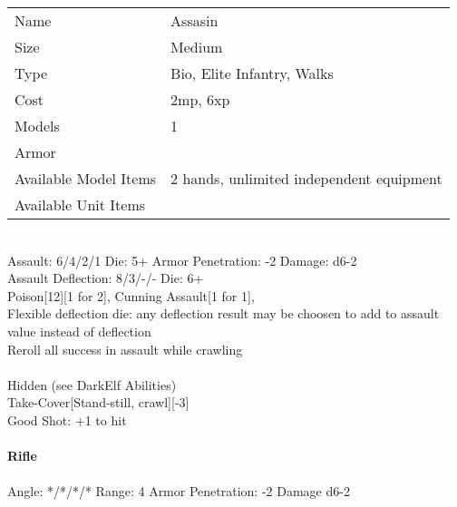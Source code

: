 \begin{tabular}{ll}
  Name & Assasin \\
  Size & Medium\\
  Type & Bio, Elite Infantry, Walks\\
  Cost & 2mp, 6xp\\
  Models & 1\\
  Armor & \\
  Available Model Items & 2 hands, unlimited independent equipment \\
  Available Unit Items &  \\
\end{tabular}

\ \\
Assault: 6/4/2/1 Die: 5+ Armor Penetration: -2 Damage: d6-2 \\
Assault Deflection: 8/3/-/- Die: 6+\\
\indent Poison[12][1 for 2], Cunning Assault[1 for 1], \\ Flexible deflection die: any deflection result may be choosen to add to assault value instead of deflection\\ Reroll all success in assault while crawling \\
\ \\
Hidden (see DarkElf Abilities)\\ Take-Cover[Stand-still, crawl][-3]\\ Good Shot: +1 to hit
\ \\
\ \\
{\bf Rifle } \\
\ \\
Angle: */*/*/* Range: 4 Armor Penetration: -2 Damage d6-2 \\
\indent  \\





